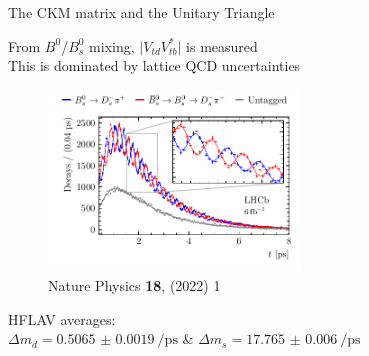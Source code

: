 \documentclass[dvipsnames]{beamer}
\begin{document}
\begin{frame}{The CKM matrix and the Unitary Triangle}
  \begin{center}
    \Large From $B^0$/$B^0_s$ mixing, $\lvert V_{td}^{\phantom{*}}V_{tb}^*\rvert$ is measured\\
    \large This is dominated by lattice QCD uncertainties
  \end{center}
  \vspace{-0.3cm}
  \begin{figure}
    \centering
    \includegraphics[width = 0.6\textwidth]{Plots/Bs_mixing.pdf}
    \vspace{-0.8cm}
    \caption*{\tiny Nature Physics \textbf{18}, (2022) 1}
  \end{figure}
  \vspace{-0.8cm}
  \begin{center}
    \Large HFLAV averages:\\
    \large $\Delta m_d = \SI{0.5065(19)}{\per\pico\second}$ \& $\Delta m_s = \SI{17.765(6)}{\per\pico\second}$
  \end{center}
\end{frame}
\end{document}
